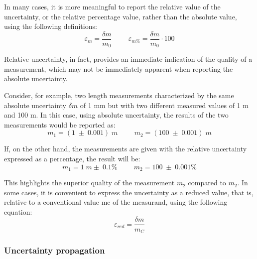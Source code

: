 \documentclass[../main.tex]{subfiles}
\begin{document}
In many cases, it is more meaningful to report the relative value of the uncertainty, or the relative percentage value, rather than the absolute value, using the following definitions:\\

\begin{equation}
	\varepsilon_m = \frac{\delta m}{m_0} \hspace{1cm} \varepsilon_{m\%} = \frac{\delta m}{m_0} \cdot 100
\end{equation}

Relative uncertainty, in fact, provides an immediate indication of the quality of a measurement, which may not be immediately apparent when reporting the absolute uncertainty. 

Consider, for example, two length measurements characterized by the same absolute uncertainty $\delta m$ of 1 mm but with two different measured values of 1 m and 100 m. In this case, using absolute uncertainty, the results of the two measurements would be reported as:\\



\begin{equation}
	m_1 = (1\; \pm\; 0.001) \; \unit{m} \hspace{1cm} m_2 = (100\; \pm\; 0.001) \; \unit{m}
\end{equation}

If, on the other hand, the measurements are given with the relative uncertainty expressed as a percentage, the result will be:\\

\begin{equation}
	m_1 = 1\; \unit{m} \pm\; 0.1 \%  \hspace{1cm} m_2 = 100\; \pm\; 0.001 \%
\end{equation}


This highlights the superior quality of the measurement $m_2$ compared to $m_2$.
In some cases, it is convenient to express the uncertainty as a reduced value, that is, relative to a conventional value mc of the measurand, using the following equation:\\

\begin{equation}
	\varepsilon_{red} = \frac{\delta m}{m_C}
\end{equation}

\subsubsection{Uncertainty propagation}
\end{document}
